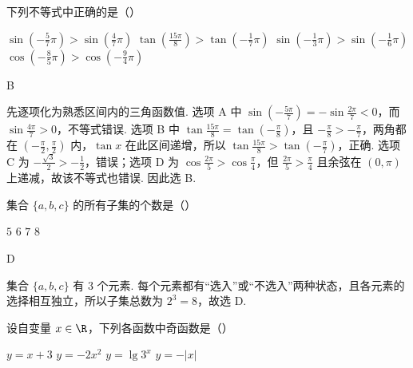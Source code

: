 \documentclass[UTF8,a4paper,oneside,11pt]{ctexbook}
\begin{document}
\begin{problem}

下列不等式中正确的是（\quad）

\choices
    {\(\sin\left(-\frac{5}{7}\pi\right)>\sin\left(\frac{4}{7}\pi\right)\)}
    {\(\tan\left(\frac{15\pi}{8}\right)>\tan\left(-\frac{1}{7}\pi\right)\)}
    {\(\sin\left(-\frac{1}{3}\pi\right)>\sin\left(-\frac{1}{6}\pi\right)\)}
    {\(\cos\left(-\frac{8}{5}\pi\right)>\cos\left(-\frac{9}{4}\pi\right)\)}
\end{problem}

\begin{answer}
B
\end{answer}

\begin{solution}
先逐项化为熟悉区间内的三角函数值. 选项 A 中 \(\sin\left(-\frac{5\pi}{7}\right)=-\sin\frac{2\pi}{7}<0\)，而 \(\sin\frac{4\pi}{7}>0\)，不等式错误. 选项 B 中 \(\tan\frac{15\pi}{8}=\tan\left(-\frac{\pi}{8}\right)\)，且 \(-\frac{\pi}{8}>-\frac{\pi}{7}\)，两角都在 \(\left(-\frac{\pi}{2},\frac{\pi}{2}\right)\) 内，\(\tan x\) 在此区间递增，所以 \(\tan\frac{15\pi}{8}>\tan\left(-\frac{\pi}{7}\right)\)，正确. 选项 C 为 \(-\frac{\sqrt3}{2}>-\frac12\)，错误；选项 D 为 \(\cos\frac{2\pi}{5}>\cos\frac{\pi}{4}\)，但 \(\frac{2\pi}{5}>\frac{\pi}{4}\) 且余弦在 \((0,\pi)\) 上递减，故该不等式也错误. 因此选 B.
\end{solution}

\begin{problem}

集合 \(\{a, b, c\}\) 的所有子集的个数是（\quad）

\choices
    {\(5\)}
    {\(6\)}
    {\(7\)}
    {\(8\)}
\end{problem}

\begin{answer}
D
\end{answer}

\begin{solution}
集合 \(\{a,b,c\}\) 有 \(3\) 个元素. 每个元素都有“选入”或“不选入”两种状态，且各元素的选择相互独立，所以子集总数为 \(2^3=8\)，故选 D.
\end{solution}

\begin{problem}

设自变量 \(x \in \R\)，下列各函数中奇函数是（\quad）

\choices
    {\(y = x + 3 \)}
    {\(y = -2x^{2} \)}
    {\(y = \lg 3^x \)}
    {\(y = -|x| \)}
\end{problem}
\end{document}
